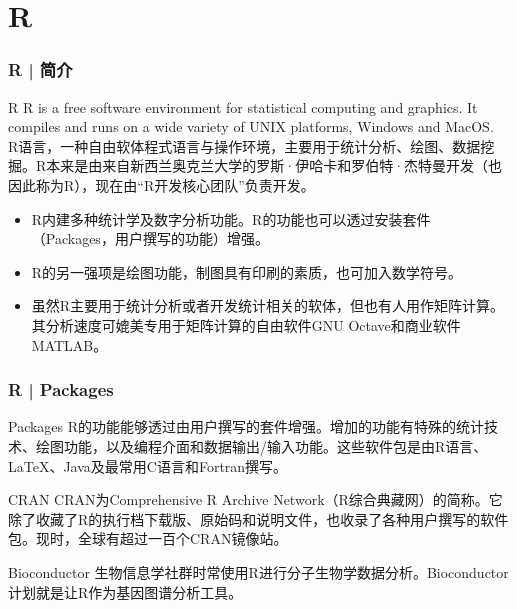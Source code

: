\section{R}
\begin{frame}
  \frametitle{R | 简介}
  \begin{block}{R}
 R is a free software environment for statistical computing and graphics. It compiles and runs on a wide variety of UNIX platforms, Windows and MacOS.\\
\vspace{0.3em}
\alert{R语言}，一种自由软体程式语言与操作环境，主要用于\alert{统计分析、绘图、数据挖掘}。R本来是由来自新西兰奥克兰大学的罗斯·伊哈卡和罗伯特·杰特曼开发（也因此称为R），现在由“R开发核心团队”负责开发。\\
\begin{itemize}
  \item R内建多种统计学及数字分析功能。R的功能也可以透过安装套件（Packages，用户撰写的功能）增强。
  \item R的另一强项是绘图功能，制图具有印刷的素质，也可加入数学符号。
  \item 虽然R主要用于统计分析或者开发统计相关的软体，但也有人用作矩阵计算。其分析速度可媲美专用于矩阵计算的自由软件GNU Octave和商业软件MATLAB。
\end{itemize}
  \end{block}
\end{frame}

\begin{frame}
  \frametitle{R | Packages}
  \begin{block}{Packages}
R的功能能够透过由用户撰写的套件增强。增加的功能有特殊的统计技术、绘图功能，以及编程介面和数据输出/输入功能。这些软件包是由R语言、LaTeX、Java及最常用C语言和Fortran撰写。
  \end{block}
  \pause
  \begin{block}{\alert{CRAN}}
    CRAN为Comprehensive R Archive Network（R综合典藏网）的简称。它除了收藏了R的执行档下载版、原始码和说明文件，也收录了各种用户撰写的软件包。现时，全球有超过一百个CRAN镜像站。
  \end{block}
  \pause
  \begin{block}{\alert{Bioconductor}}
    生物信息学社群时常使用R进行分子生物学数据分析。Bioconductor计划就是让R作为基因图谱分析工具。
  \end{block}
\end{frame}

